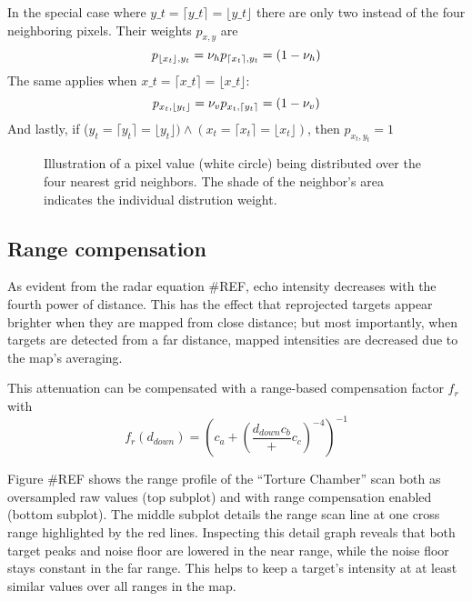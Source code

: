 In the special case where $y\_t = \lceil y\_t \rceil = \lfloor y\_t\rfloor$ there are only two instead of the four neighboring pixels. Their weights \(p_{x,y}\) are \[
p_{\lfloor x_t \rfloor, y_t} = \nu_h\\
p_{\lceil x_t \rceil, y_t} = (1 - \nu_h)
\] The same applies when $x\_t = \lceil x\_t \rceil = \lfloor x\_t\rfloor$: \[
p_{x_t, \lfloor y_t \rfloor} = \nu_v\\
p_{x_t, \lceil y_t \rceil} = (1 - \nu_v)
\] And lastly, if
(\(y_t = \lceil y_t \rceil = \lfloor y_t \rfloor ) \land (x_t = \lceil x_t \rceil = \lfloor x_t \rfloor )\),
then \(p_{x_t, y_t} = 1\)

\begin{figure}[htp]
    \centering
    \label{fig:Sample_splitting}
    \def\svgwidth{10cm}
    
    \caption{Illustration of a pixel value (white circle) being distributed over the four nearest grid neighbors. The shade of the neighbor's area indicates the individual distrution weight.}
\end{figure}

\subsection{Range compensation}\label{range-compensation}

As evident from the radar equation \#REF, echo intensity decreases with
the fourth power of distance. This has the effect that reprojected
targets appear brighter when they are mapped from close distance; but
most importantly, when targets are detected from a far distance, mapped
intensities are decreased due to the map's averaging.

This attenuation can be compensated with a range-based compensation
factor \(f_r\) with \[f_r(d_{down}) = {
\left(
c_a + (
\frac{{d_{down}}{c_b}}
+ c_c)^{-4}
\right) ^ {-1}
}\]



Figure \#REF shows the range profile of the ``Torture Chamber'' scan
both as oversampled raw values (top subplot) and with range compensation
enabled (bottom subplot). The middle subplot details the range scan line
at one cross range highlighted by the red lines. Inspecting this detail
graph reveals that both target peaks and noise floor are lowered in the
near range, while the noise floor stays constant in the far range. This
helps to keep a target's intensity at at least similar values over all
ranges in the map.

